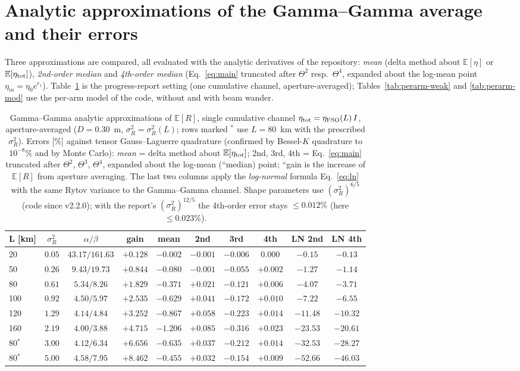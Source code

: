 \documentclass[11pt,a4paper]{article}
\theoremstyle{plain}
\theoremstyle{remark}
\begin{document}
\section{Analytic approximations of the Gamma--Gamma average and their errors}
\label{sec:approx}
Three approximations are compared, all evaluated with the analytic derivatives of the repository: \emph{mean} (delta method about $\mathbb E[\eta]$ or $\mathbb E[\eta_{\rm tot}]$), \emph{2nd-order median} and \emph{4th-order median} (Eq.~\eqref{eq:main} truncated after $\Theta^2$ resp.\ $\Theta^4$, expanded about the log-mean point $\eta_m=\eta_0e^{c_1}$). Table~\ref{tab:gg-single} is the progress-report setting (one cumulative channel, aperture-averaged); Tables~\ref{tab:perarm-weak} and \ref{tab:perarm-mod} use the per-arm model of the code, without and with beam wander.
\begin{table}[htbp]
\centering\scriptsize
\caption{Gamma--Gamma analytic approximations of $\mathbb E[R]$, single cumulative channel $\eta_{\rm tot}=\eta_{\rm FSO}(L)\,I$, aperture-averaged ($D=0.30$~m, $\sigma_R^2=\sigma_R^2(L)$; rows marked $^{*}$ use $L=80$~km with the prescribed $\sigma_R^2$). Errors [\%] against tensor Gauss--Laguerre quadrature (confirmed by Bessel-$K$ quadrature to $10^{-8}\%$ and by Monte Carlo): \emph{mean} = delta method about $\mathbb E[\eta_{\rm tot}]$; 2nd, 3rd, 4th = Eq.~\eqref{eq:main} truncated after $\Theta^2$, $\Theta^3$, $\Theta^4$, expanded about the log-mean (``median) point; ``gain is the increase of $\mathbb E[R]$ from aperture averaging. The last two columns apply the \emph{log-normal} formula Eq.~\eqref{eq:ln} with the same Rytov variance to the Gamma--Gamma channel. Shape parameters use $(\sigma_R^2)^{6/5}$ (code since v2.2.0); with the report's $(\sigma_R^2)^{12/5}$ the 4th-order error stays $\le0.012\%$ (here $\le0.023\%$).}
\label{tab:gg-single}
\begin{tabular}{lccccccccc}
\toprule
L [km] & $\sigma_R^2$ & $\alpha/\beta$ & gain & mean & 2nd & 3rd & 4th & LN 2nd & LN 4th\\
\midrule
20 & $0.05$ & $43.17/161.63$ & $+0.128$ & $-0.002$ & $-0.001$ & $-0.006$ & $0.000$ & $-0.15$ & $-0.13$ \\
50 & $0.26$ & $9.43/19.73$ & $+0.844$ & $-0.080$ & $-0.001$ & $-0.055$ & $+0.002$ & $-1.27$ & $-1.14$ \\
80 & $0.61$ & $5.34/8.26$ & $+1.829$ & $-0.371$ & $+0.021$ & $-0.121$ & $+0.006$ & $-4.07$ & $-3.71$ \\
100 & $0.92$ & $4.50/5.97$ & $+2.535$ & $-0.629$ & $+0.041$ & $-0.172$ & $+0.010$ & $-7.22$ & $-6.55$ \\
120 & $1.29$ & $4.14/4.84$ & $+3.252$ & $-0.867$ & $+0.058$ & $-0.223$ & $+0.014$ & $-11.48$ & $-10.32$ \\
160 & $2.19$ & $4.00/3.88$ & $+4.715$ & $-1.206$ & $+0.085$ & $-0.316$ & $+0.023$ & $-23.53$ & $-20.61$ \\
80$^{*}$ & $3.00$ & $4.12/6.34$ & $+6.656$ & $-0.635$ & $+0.037$ & $-0.212$ & $+0.014$ & $-32.53$ & $-28.27$ \\
80$^{*}$ & $5.00$ & $4.58/7.95$ & $+8.462$ & $-0.455$ & $+0.032$ & $-0.154$ & $+0.009$ & $-52.66$ & $-46.03$ \\


\end{tabular}
\end{table}
\end{document}
